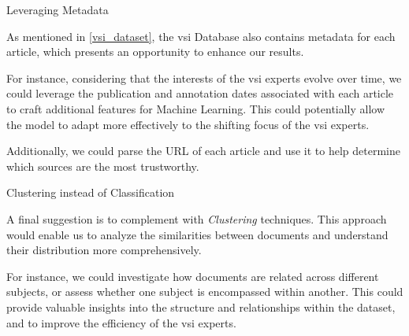 \begin{paragraph}{Leveraging Metadata}

As mentioned in \headerName{} \ref{vsi_dataset}, the \gls{vsi} Database also contains metadata for each article, which presents an opportunity to enhance our results.

For instance, considering that the interests of the \gls{vsi} experts evolve over time, we could leverage the publication and annotation dates associated with each article to craft additional features for Machine Learning. This could potentially allow the model to adapt more effectively to the shifting focus of the \gls{vsi} experts.

Additionally, we could parse the URL of each article and use it to help determine which sources are the most trustworthy.

\end{paragraph}

\begin{paragraph}{Clustering instead of Classification}

A final suggestion is to complement \textclassification{} with \emph{Clustering} techniques. This approach would enable us to analyze the similarities between documents and understand their distribution more comprehensively. 

For instance, we could investigate how documents are related across different subjects, or assess whether one subject is encompassed within another. This could provide valuable insights into the structure and relationships within the dataset, and to improve the efficiency of the \gls{vsi} experts.

    
\end{paragraph}